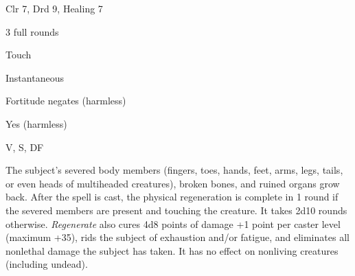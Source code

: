 
\begin{description*}
\item[Level:] Clr 7, Drd 9, Healing 7
\item[Casting Time:] 3 full rounds
\item[Range:] Touch
\item[Duration:] Instantaneous
\item[Saving Throw:] Fortitude negates (harmless)
\item[Spell Resistance:] Yes (harmless)
\item[Components:] V, S, DF
\end{description*}

The subject's severed body members (fingers, toes, hands, feet, arms, legs, tails,
or even heads of multiheaded creatures), broken bones, and ruined organs grow back.
After the spell is cast, the physical regeneration is complete in 1 round if the
severed members are present and touching the creature. It takes 2d10 rounds otherwise.
\textit{Regenerate} also cures 4d8 points of damage +1 point per caster level (maximum
+35), rids the subject of exhaustion and/or fatigue, and eliminates all nonlethal
damage the subject has taken. It has no effect on nonliving creatures (including
undead).